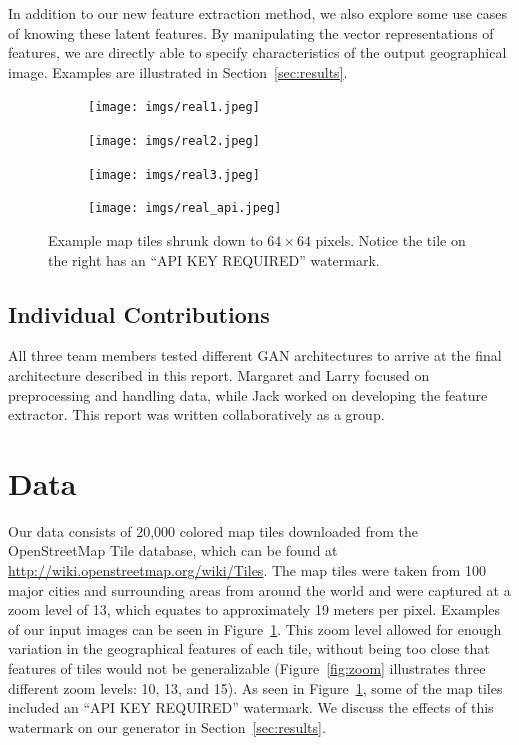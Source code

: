 \documentclass[11pt,twocolumn,letterpaper]{article}
\begin{document}
In addition to our new feature extraction method, we also explore some use cases of knowing these latent features. By manipulating the vector representations of features, we are directly able to specify characteristics of the output geographical image. Examples are illustrated in Section~\ref{sec:results}.

\begin{figure}[ht]
    \centering
    \begin{subfigure}[b]{0.24\linewidth}
        \texttt{[image: imgs/real1.jpeg]}
    \end{subfigure}
    \begin{subfigure}[b]{0.24\linewidth}
        \texttt{[image: imgs/real2.jpeg]}
    \end{subfigure}
    \begin{subfigure}[b]{0.24\linewidth}
        \texttt{[image: imgs/real3.jpeg]}
    \end{subfigure}
    \begin{subfigure}[b]{0.24\linewidth}
        \texttt{[image: imgs/real\_api.jpeg]}
    \end{subfigure}
        \caption{Example map tiles shrunk down to $64 \times 64$ pixels. Notice the tile on the right has an ``API KEY REQUIRED'' watermark.}
        \label{fig:tiles}
\end{figure}

\subsection{Individual Contributions}
All three team members tested different GAN architectures to arrive at the final architecture described in this report. Margaret and Larry focused on preprocessing and handling data, while Jack worked on developing the feature extractor. This report was written collaboratively as a group.

\section{Data}
Our data consists of 20,000 colored map tiles downloaded from the OpenStreetMap Tile database, which can be found at \url{http://wiki.openstreetmap.org/wiki/Tiles}. The map tiles were taken from 100 major cities and surrounding areas from around the world and were captured at a zoom level of 13, which equates to approximately 19 meters per pixel. Examples of our input images can be seen in Figure~\ref{fig:tiles}. This zoom level allowed for enough variation in the geographical features of each tile, without being too close that features of tiles would not be generalizable (Figure~\ref{fig:zoom} illustrates three different zoom levels: 10, 13, and 15). As seen in Figure~\ref{fig:tiles}, some of the map tiles included an ``API KEY REQUIRED'' watermark. We discuss the effects of this watermark on our generator in Section~\ref{sec:results}.
\end{document}

